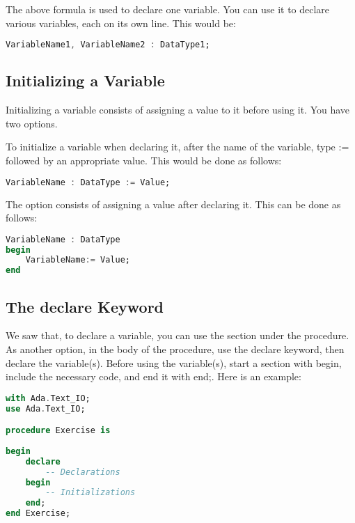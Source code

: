 \documentclass[12pt]{book}
\begin{document}
The above formula is used to declare one variable. You can use it to declare various variables, each on its own line. This would be:



\lstset{style=mystyle}
\begin{lstlisting}[language=Ada, caption=Ada example]
VariableName1, VariableName2 : DataType1;
\end{lstlisting}



\subsection{Initializing a Variable}


Initializing a variable consists of assigning a value to it before using it. You have two options.

To initialize a variable when declaring it, after the name of the variable, type := followed by an appropriate value. This would be done as follows:

\lstset{style=mystyle}
\begin{lstlisting}[language=Ada, caption=Ada example]
VariableName : DataType := Value;
\end{lstlisting}


The option consists of assigning a value after declaring it. This can be done as follows:



\lstset{style=mystyle}
\begin{lstlisting}[language=Ada, caption=Ada example]
VariableName : DataType
begin
    VariableName:= Value;
end
\end{lstlisting}


\subsection{The declare Keyword}

We saw that, to declare a variable, you can use the section under the procedure. As another option, in the body of the procedure, use the declare keyword, then declare the variable(s). Before using the variable(s), start a section with begin, include the necessary code, and end it with end;. Here is an example:


\lstset{style=mystyle}
\begin{lstlisting}[language=Ada, caption=Ada example]
with Ada.Text_IO;
use Ada.Text_IO;

procedure Exercise is
   
begin
    declare
        -- Declarations
    begin
        -- Initializations
    end;
end Exercise;
\end{lstlisting}
\end{document}
